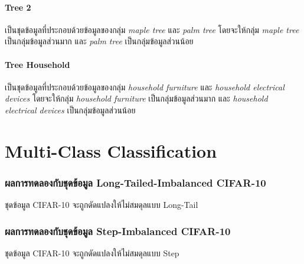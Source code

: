 \paragraph{Tree 2}
เป็นชุดข้อมูลที่ประกอบด้วยข้อมูลของกลุ่ม \emph{maple tree} และ \emph{palm tree} โดยจะให้กลุ่ม \emph{maple tree} เป็นกลุ่มข้อมูลส่วนมาก และ \emph{palm tree} เป็นกลุ่มข้อมูลส่วนน้อย

\paragraph{Tree Household}
เป็นชุดข้อมูลที่ประกอบด้วยข้อมูลของกลุ่ม \emph{household furniture} และ \emph{household electrical devices} โดยจะให้กลุ่ม \emph{household furniture} เป็นกลุ่มข้อมูลส่วนมาก และ \emph{household electrical devices} เป็นกลุ่มข้อมูลส่วนน้อย


\label{ex:cifar-100}
\section{Multi-Class Classification}
\subsubsection{ผลการทดลองกับชุดข้อมูล Long-Tailed-Imbalanced CIFAR-10}
ชุดข้อมูล CIFAR-10 จะถูกดัดแปลงให้ไม่สมดุลแบบ Long-Tail
\label{ex:long-tailed-cifar-10}
\subsubsection{ผลการทดลองกับชุดข้อมูล Step-Imbalanced CIFAR-10}
ชุดข้อมูล CIFAR-10 จะถูกดัดแปลงให้ไม่สมดุลแบบ Step
\label{ex:step-cifar-100}
